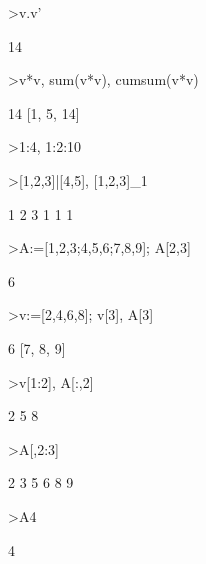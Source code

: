 \documentclass[a4paper,11pt,oneside,enabledeprecatedfontcommands]{scrbook}
\newenvironment{eulernotebook}{}{}
\begin{document}
\begin{eulernotebook}
\begin{eulerprompt}
>v.v'
\end{eulerprompt}
\begin{euleroutput}
14
\end{euleroutput}
\begin{eulerprompt}
>v*v, sum(v*v), cumsum(v*v)
\end{eulerprompt}
\begin{euleroutput}
[1,  4,  9]
14
[1,  5,  14]
\end{euleroutput}
\begin{eulerprompt}
>1:4, 1:2:10
\end{eulerprompt}
\begin{euleroutput}
[1,  2,  3,  4]
[1,  3,  5,  7,  9]
\end{euleroutput}
\begin{eulerprompt}
>[1,2,3]|[4,5], [1,2,3]_1
\end{eulerprompt}
\begin{euleroutput}
[1,  2,  3,  4,  5]
            1             2             3 
            1             1             1 
\end{euleroutput}
\begin{eulerprompt}
>A:=[1,2,3;4,5,6;7,8,9]; A[2,3]
\end{eulerprompt}
\begin{euleroutput}
6
\end{euleroutput}
\begin{eulerprompt}
>v:=[2,4,6,8]; v[3], A[3]
\end{eulerprompt}
\begin{euleroutput}
6
[7,  8,  9]
\end{euleroutput}
\begin{eulerprompt}
>v[1:2], A[:,2]
\end{eulerprompt}
\begin{euleroutput}
[2,  4]
            2 
            5 
            8 
\end{euleroutput}
\begin{eulerprompt}
>A[,2:3]
\end{eulerprompt}
\begin{euleroutput}
            2             3 
            5             6 
            8             9 
\end{euleroutput}
\begin{eulerprompt}
>A{4}
\end{eulerprompt}
\begin{euleroutput}
4
\end{euleroutput}

\end{eulernotebook}
\end{document}
